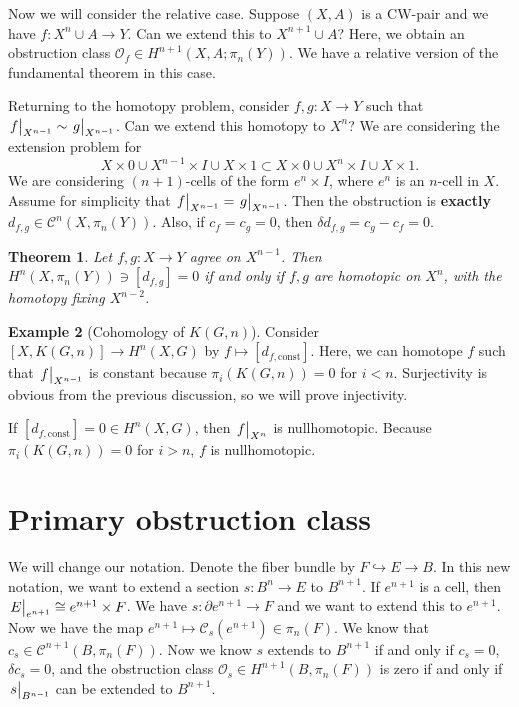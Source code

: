 \documentclass[leqno, openany]{memoir}
\newtheorem{thm}{Theorem}[section]
\theoremstyle{definition}
\newtheorem{exm}[thm]{Example}
\theoremstyle{remark}
\theoremstyle{plain}
\theoremstyle{definition}
\theoremstyle{remark}
\newcommand{\mc}[1]{\mathcal{#1}}
\begin{document}
Now we will consider the relative case. Suppose $(X, A)$ is a CW-pair and we
have $f \colon X^n \cup A \to Y$. Can we extend this to $X^{n+1} \cup A$? Here,
we obtain an obstruction class $\mc{O}_f \in H^{n+1}(X, A; \pi_n(Y))$. We have
a relative version of the fundamental theorem in this case.

Returning to the homotopy problem, consider $f, g \colon X \to Y$ such that
$\eval{f}_{X^{n-1}} \sim \eval{g}_{X^{n-1}}$. Can we extend this homotopy to
$X^n$? We are considering the extension problem for \[ X \times \qty{0} \cup
X^{n-1} \times I \cup X \times \qty{1} \subset X \times \qty{0} \cup X^n \times
I \cup X \times \qty{1}. \] We are considering $(n+1)$-cells of the form $e^n
\times I$, where $e^n$ is an $n$-cell in $X$. Assume for simplicity that
$\eval{f}_{X^{n-1}} = \eval{g}_{X^{n-1}}$. Then the obstruction is
\textbf{exactly} $d_{f,g} \in \mc{C}^n(X, \pi_n(Y))$. Also, if $c_f = c_g = 0$,
then $\delta d_{f,g} = c_g - c_f = 0$.

\begin{thm} Let $f, g \colon X \to Y$ agree on $X^{n-1}$. Then $H^n(X,
\pi_n(Y)) \ni [d_{f,g}] = 0$ if and only if $f,g$ are homotopic on $X^n$, with
the homotopy fixing $X^{n-2}$.  \end{thm}

\begin{exm}[Cohomology of $K(G, n)$] Consider $[X, K(G, n)] \to H^n(X, G)$ by
    $f \mapsto [d_{f, \text{const}}]$. Here, we can homotope $f$ such that
    $\eval{f}_{X^{n-1}}$ is constant because $\pi_i(K(G, n)) = 0$ for $i < n$.
    Surjectivity is obvious from the previous discussion, so we will prove
    injectivity.

    If $[d_{f, \text{const}}] = 0 \in H^n(X, G)$, then $\eval{f}_{X^n}$ is
nullhomotopic. Because $\pi_i(K(G, n)) = 0$ for $i > n$, $f$ is nullhomotopic.
\end{exm}

\section{Primary obstruction class}%

We will change our notation. Denote the fiber bundle by $F \hookrightarrow E
\to B$. In this new notation, we want to extend a section $s \colon B^n \to E$
to $B^{n+1}$. If $e^{n+1}$ is a cell, then $\eval{E}_{e^{n+1}} \cong e^{n+1}
\times F$. We have $s \colon \partial e^{n+1} \to F$ and we want to extend this
to $e^{n+1}$. Now we have the map $e^{n+1} \mapsto \mc{C}_s(e^{n+1}) \in
\pi_n(F)$. We know that $c_s \in \mc{C}^{n+1}(B, \pi_n(F))$. Now we know $s$
extends to $B^{n+1}$ if and only if $c_s = 0$, $\delta c_s = 0$, and the
obstruction class $\mc{O}_s \in H^{n+1}(B, \pi_n(F))$ is zero if and only if
$\eval{s}_{B^{n-1}}$ can be extended to $B^{n+1}$.
\end{document}
